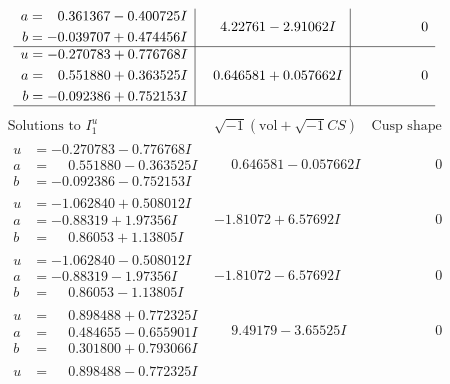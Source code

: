 \documentclass[1p]{elsarticle_modified}
\theoremstyle{definition}
\newcommand{\I}{\sqrt{-1}}
\begin{document}
$$\begin{array}{c|c|c}
\begin{aligned}
a &= \phantom{-}0.361367 - 0.400725 I \\
b &= -0.039707 + 0.474456 I\end{aligned}
 & \phantom{-}4.22761 - 2.91062 I & \phantom{-0.000000 } 0 \\ \hline\begin{aligned}
u &= -0.270783 + 0.776768 I \\
a &= \phantom{-}0.551880 + 0.363525 I \\
b &= -0.092386 + 0.752153 I\end{aligned}
 & \phantom{-}0.646581 + 0.057662 I & \phantom{-0.000000 } 0\\
 \hline 
 \end{array}$$\newpage$$\begin{array}{c|c|c}  
\text{Solutions to }I^u_{1}& \I (\text{vol} + \sqrt{-1}CS) & \text{Cusp shape}\\
 \hline 
\begin{aligned}
u &= -0.270783 - 0.776768 I \\
a &= \phantom{-}0.551880 - 0.363525 I \\
b &= -0.092386 - 0.752153 I\end{aligned}
 & \phantom{-}0.646581 - 0.057662 I & \phantom{-0.000000 } 0 \\ \hline\begin{aligned}
u &= -1.062840 + 0.508012 I \\
a &= -0.88319 + 1.97356 I \\
b &= \phantom{-}0.86053 + 1.13805 I\end{aligned}
 & -1.81072 + 6.57692 I & \phantom{-0.000000 } 0 \\ \hline\begin{aligned}
u &= -1.062840 - 0.508012 I \\
a &= -0.88319 - 1.97356 I \\
b &= \phantom{-}0.86053 - 1.13805 I\end{aligned}
 & -1.81072 - 6.57692 I & \phantom{-0.000000 } 0 \\ \hline\begin{aligned}
u &= \phantom{-}0.898488 + 0.772325 I \\
a &= \phantom{-}0.484655 - 0.655901 I \\
b &= \phantom{-}0.301800 + 0.793066 I\end{aligned}
 & \phantom{-}9.49179 - 3.65525 I & \phantom{-0.000000 } 0 \\ \hline\begin{aligned}
u &= \phantom{-}0.898488 - 0.772325 I \\

\end{aligned}
\end{array}$$
\end{document}
